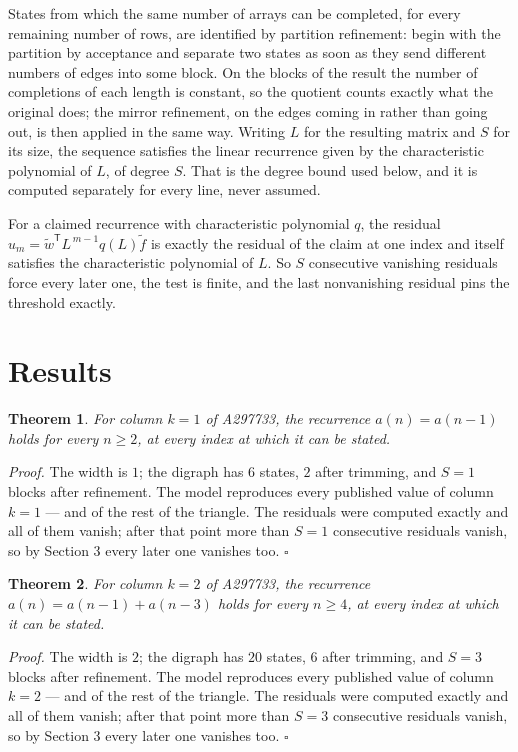 \documentclass[11pt]{article}
\newtheorem{theorem}{Theorem}
\theoremstyle{definition}
\begin{document}
States from which the same number of arrays can be completed, for every remaining number of rows, are identified by partition refinement: begin with the partition by acceptance and separate two states as soon as they send different numbers of edges into some block. On the blocks of the result the number of completions of each length is constant, so the quotient counts exactly what the original does; the mirror refinement, on the edges coming in rather than going out, is then applied in the same way. Writing $L$ for the resulting matrix and $S$ for its size, the sequence satisfies the linear recurrence given by the characteristic polynomial of $L$, of degree $S$. That is the degree bound used below, and it is computed separately for every line, never assumed.

For a claimed recurrence with characteristic polynomial $q$, the residual $u_m = \tilde w^{\mathsf T}L^{\,m-1}q(L)\tilde f$ is exactly the residual of the claim at one index and itself satisfies the characteristic polynomial of $L$. So $S$ consecutive vanishing residuals force every later one, the test is finite, and the last nonvanishing residual pins the threshold exactly.

\section{Results}

\begin{theorem} For column $k = 1$ of A297733, the recurrence $a(n) = a(n-1)$ holds for every $n \ge 2$, at every index at which it can be stated.\end{theorem}

{\itshape Proof.} The width is $1$; the digraph has $6$ states, $2$ after trimming, and $S = 1$ blocks after refinement. The model reproduces every published value of column $k = 1$ --- and of the rest of the triangle. The residuals were computed exactly and all of them vanish; after that point more than $S = 1$ consecutive residuals vanish, so by Section 3 every later one vanishes too. $\square$

\begin{theorem} For column $k = 2$ of A297733, the recurrence $a(n) = a(n-1) + a(n-3)$ holds for every $n \ge 4$, at every index at which it can be stated.\end{theorem}

{\itshape Proof.} The width is $2$; the digraph has $20$ states, $6$ after trimming, and $S = 3$ blocks after refinement. The model reproduces every published value of column $k = 2$ --- and of the rest of the triangle. The residuals were computed exactly and all of them vanish; after that point more than $S = 3$ consecutive residuals vanish, so by Section 3 every later one vanishes too. $\square$
\end{document}
